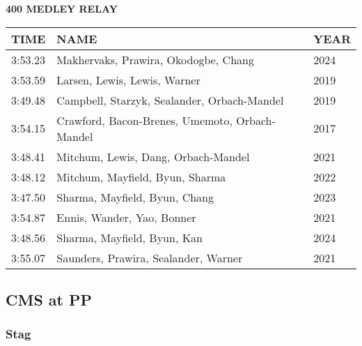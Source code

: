 \begin{table}[H]
\centering
\begin{minipage}[t]{0.6\textwidth}
\centering
\textbf{400 MEDLEY RELAY}\\[0.1cm]
\begin{tabular}{@{}p{1.8cm}p{2.8cm}p{1.2cm}@{}}
\hline
    \textbf{TIME} & \textbf{NAME} & \textbf{YEAR} \\
\hline
    3:53.23 & Makhervaks, Prawira, Okodogbe, Chang & 2024 \\
    3:53.59 & Larsen, Lewis, Lewis, Warner & 2019 \\
    3:49.48 & Campbell, Starzyk, Sealander, Orbach-Mandel & 2019 \\
    3:54.15 & Crawford, Bacon-Brenes, Umemoto, Orbach-Mandel & 2017 \\
    3:48.41 & Mitchum, Lewis, Dang, Orbach-Mandel & 2021 \\
    3:48.12 & Mitchum, Mayfield, Byun, Sharma & 2022 \\
    3:47.50 & Sharma, Mayfield, Byun, Chang & 2023 \\
    3:54.87 & Ennis, Wander, Yao, Bonner & 2021 \\
    3:48.56 & Sharma, Mayfield, Byun, Kan & 2024 \\
    3:55.07 & Saunders, Prawira, Sealander, Warner & 2021 \\
\hline
\end{tabular}
\end{minipage}
\end{table}


\newpage

\subsection{CMS at PP}
\subsubsection{Stag}

